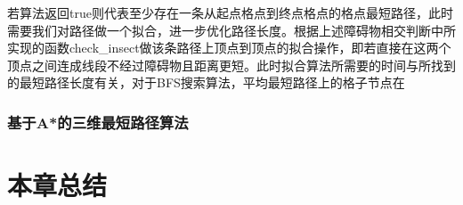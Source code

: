 
\par 若算法返回true则代表至少存在一条从起点格点到终点格点的格点最短路径，此时需要我们对路径做一个拟合，进一步优化路径长度。根据上述障碍物相交判断中所实现的函数check_insect做该条路径上顶点到顶点的拟合操作，即若直接在这两个顶点之间连成线段不经过障碍物且距离更短。此时拟合算法所需要的时间与所找到的最短路径长度有关，对于BFS搜索算法，平均最短路径上的格子节点在$$
\subsubsection{基于A*的三维最短路径算法}

\section{本章总结}
